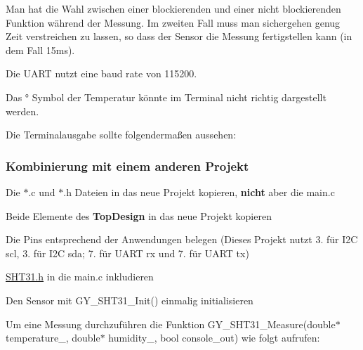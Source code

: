 Man hat die Wahl zwischen einer blockierenden und einer nicht blockierenden Funktion während der Messung. Im zweiten Fall muss man sichergehen genug Zeit verstreichen zu lassen, so dass der Sensor die Messung fertigstellen kann (in dem Fall 15ms).

Die U\+A\+RT nutzt eine baud rate von 115200.

Das ° Symbol der Temperatur könnte im Terminal nicht richtig dargestellt werden.

Die Terminalausgabe sollte folgendermaßen aussehen\+: 
\begin{DoxyCode}{0}
\end{DoxyCode}
 \hypertarget{index_autotoc_md4}{}\subsubsection{Kombinierung mit einem anderen Projekt}\label{index_autotoc_md4}

\begin{DoxyItemize}
\item Die $\ast$.c und $\ast$.h Dateien in das neue Projekt kopieren, {\bfseries{nicht}} aber die main.\+c
\item Beide Elemente des {\bfseries{Top\+Design}} in das neue Projekt kopieren
\item Die Pins entsprechend der Anwendungen belegen (Dieses Projekt nutzt 3. für I2C scl, 3. für I2C sda; 7. für U\+A\+RT rx und 7. für U\+A\+RT tx)
\item \mbox{\hyperlink{_s_h_t31_8h_source}{S\+H\+T31.\+h}} in die main.\+c inkludieren
\item Den Sensor mit {\ttfamily G\+Y\+\_\+\+S\+H\+T31\+\_\+\+Init()} einmalig initialisieren
\end{DoxyItemize}

Um eine Messung durchzuführen die Funktion {\ttfamily G\+Y\+\_\+\+S\+H\+T31\+\_\+\+Measure(double$\ast$ temperature\+\_\+, double$\ast$ humidity\+\_\+, bool console\+\_\+out)} wie folgt aufrufen\+: 
\begin{DoxyCode}{0}
\DoxyCodeLine{}
\end{DoxyCode}


